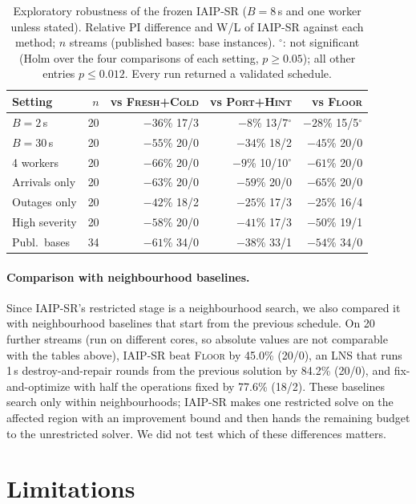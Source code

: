 \documentclass[letterpaper]{article} %
\newcommand{\mfloor}{\textsc{Floor}}
\newcommand{\miaip}{\textsc{IAIP-SR}}
\newcommand{\mfresh}{\textsc{Fresh+Cold}}
\newcommand{\mph}{\textsc{Port+Hint}}
\begin{document}
\begin{table}[t]
\centering
\small
\setlength{\tabcolsep}{2pt}
\begin{tabular}{lrrrr}
\toprule
Setting & $n$ & vs \mfresh & vs \mph & vs \mfloor \\
\midrule
$B=2$\,s & 20 & $-36$\% 17/3 & $-8$\% 13/7$^\circ$ & $-28$\% 15/5$^\circ$ \\
$B=30$\,s & 20 & $-55$\% 20/0 & $-34$\% 18/2 & $-45$\% 20/0 \\
4 workers & 20 & $-66$\% 20/0 & $-9$\% 10/10$^\circ$ & $-61$\% 20/0 \\
Arrivals only & 20 & $-63$\% 20/0 & $-59$\% 20/0 & $-65$\% 20/0 \\
Outages only & 20 & $-42$\% 18/2 & $-25$\% 17/3 & $-25$\% 16/4 \\
High severity & 20 & $-58$\% 20/0 & $-41$\% 17/3 & $-50$\% 19/1 \\
Publ.\ bases & 34 & $-61$\% 34/0 & $-38$\% 33/1 & $-54$\% 34/0 \\
\bottomrule
\end{tabular}
\caption{Exploratory robustness of the frozen \miaip{} ($B=8$\,s and one worker unless stated). Relative PI difference and W/L of \miaip{} against each method; $n$ streams (published bases: base instances). $^\circ$: not significant (Holm over the four comparisons of each setting, $p\ge 0.05$); all other entries $p\le 0.012$. Every run returned a validated schedule.}
\label{tab:robust}
\end{table}

\paragraph{Comparison with neighbourhood baselines.} Since \miaip's restricted stage is a neighbourhood search, we also compared it with neighbourhood baselines that start from the previous schedule. On 20 further streams (run on different cores, so absolute values are not comparable with the tables above), \miaip{} beat \mfloor{} by 45.0\% (20/0), an LNS that runs 1\,s destroy-and-repair rounds from the previous solution by 84.2\% (20/0), and fix-and-optimize with half the operations fixed by 77.6\% (18/2). These baselines search only within neighbourhoods; \miaip{} makes one restricted solve on the affected region with an improvement bound and then hands the remaining budget to the unrestricted solver. We did not test which of these differences matters.

\section{Limitations}
\end{document}
